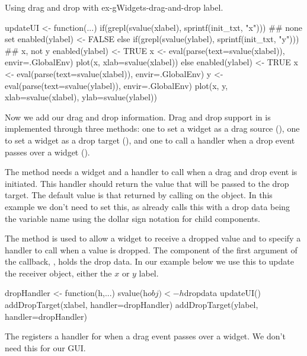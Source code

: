 \begin{example}{Using drag and drop with }{ex-gWidgets-drag-and-drop}
label.
\begin{Schunk}
\begin{Sinput}
 updateUI <- function(...) {
   if(grepl(svalue(xlabel), sprintf(init_txt, "x"))) {
     ## none set
     enabled(ylabel) <- FALSE
   } else if(grepl(svalue(ylabel), sprintf(init_txt, "y"))) {
     ## x, not y
     enabled(ylabel) <- TRUE
     x <- eval(parse(text=svalue(xlabel)), envir=.GlobalEnv)
     plot(x, xlab=svalue(xlabel))
   } else {
     enabled(ylabel) <- TRUE    
     x <- eval(parse(text=svalue(xlabel)), envir=.GlobalEnv)
     y <- eval(parse(text=svalue(ylabel)), envir=.GlobalEnv)
     plot(x, y, xlab=svalue(xlabel), ylab=svalue(ylabel))
   }
 }
\end{Sinput}
\end{Schunk}

Now we add our drag and drop information.  Drag and drop support in
 is implemented through three methods: one to set a
widget as a drag source (), one to set a widget
as a drop target (), and one to call a handler
when a drop event passes over a widget ().
  
The  method needs a widget and a handler to
call when a drag and drop event is initiated. This handler should
return the value that will be passed to the drop target. The default
value is that returned by calling  on the object. In this
example we don't need to set this, as  already
calls this with a drop data being the variable name using the dollar
sign notation for child components.
    
The  method is used to allow a widget to
receive a dropped value and to specify a handler to call when a value
is dropped. The  component of the first argument of the
callback, , holds the drop data. In our example below we use
this to update the receiver object, either the $x$ or $y$ label.

\begin{Schunk}
\begin{Sinput}
 dropHandler <- function(h,...) {
   svalue(h$obj) <- h$dropdata
   updateUI()
 }
 addDropTarget(xlabel, handler=dropHandler)
 addDropTarget(ylabel, handler=dropHandler)
\end{Sinput}
\end{Schunk}


The  registers a handler for when a drag event
passes over a widget. We don't need this for our GUI.
    
\end{example}



